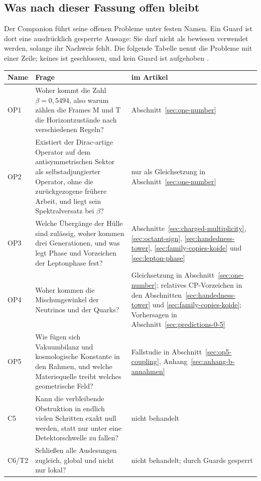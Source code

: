 \subsection{Was nach dieser Fassung offen bleibt}
\label{sec:open-points}

Der Companion führt seine offenen Probleme unter festen Namen. Ein Guard ist dort eine ausdrücklich gesperrte Aussage: Sie darf nicht
als bewiesen verwendet werden, solange ihr Nachweis fehlt. Die folgende Tabelle nennt die Probleme mit einer Zeile; keines ist
geschlossen, und kein Guard ist aufgehoben \cite{companion,layers}.

\begin{center}
\small
\begin{tabular}{@{}p{.12\linewidth}p{.55\linewidth}p{.27\linewidth}@{}}
\hline
\textbf{Name} & \textbf{Frage} & \textbf{im Artikel}\\
\hline
OP1 & Woher kommt die Zahl \(\beta=0{,}5494\), also warum zählen die Frames M und T die Horizontzustände nach verschiedenen Regeln? & Abschnitt~\ref{sec:one-number}\\
OP2 & Existiert der Dirac-artige Operator auf dem antisymmetrischen Sektor als selbstadjungierter Operator, ohne die zurückgezogene frühere Arbeit, und liegt sein Spektralversatz bei \(\beta\)? & nur als Gleichsetzung in Abschnitt~\ref{sec:one-number}\\
OP3 & Welche Übergänge der Hülle sind zulässig, woher kommen drei Generationen, und was legt Phase und Vorzeichen der Leptonphase fest? & Abschnitte~\ref{sec:charged-multiplicity}, \ref{sec:octant-sign}, \ref{sec:handedness-tower}, \ref{sec:family-copies-koide} und \ref{sec:lepton-phase}\\
OP4 & Woher kommen die Mischungswinkel der Neutrinos und der Quarks? & Gleichsetzung in Abschnitt~\ref{sec:one-number}; relatives CP-Vorzeichen in den Abschnitten~\ref{sec:handedness-tower} und \ref{sec:family-copies-koide}; Vorhersagen in Abschnitt~\ref{sec:predictions-0-5}\\
OP5 & Wie fügen sich Vakuumbilanz und kosmologische Konstante in den Rahmen, und welche Materiequelle treibt welches geometrische Feld? & Fallstudie in Abschnitt~\ref{sec:op5-coupling}, Anhang~\ref{sec:anhang-b-annahmen}\\
C5 & Kann die verbleibende Obstruktion in endlich vielen Schritten exakt null werden, statt nur unter eine Detektorschwelle zu fallen? & nicht behandelt\\
C6/T2 & Schließen alle Auslesungen zugleich, global und nicht nur lokal? & nicht behandelt; durch Guards gesperrt\\
\hline
\end{tabular}
\end{center}

